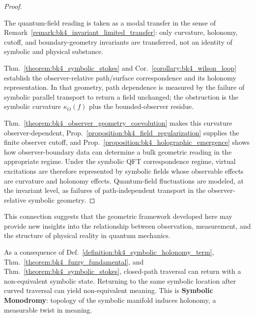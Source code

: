 \begin{proof}
\label{proof:bk4_quantum_geometry}
\leavevmode

\begin{assumption}
The quantum-field reading is taken as a modal transfer in the sense of
Remark~\ref{remark:bk4_invariant_limited_transfer}: only curvature,
holonomy, cutoff, and boundary-geometry invariants are transferred, not an
identity of symbolic and physical substance.
\end{assumption}

Thm.~\ref{theorem:bk4_symbolic_stokes} and
Cor.~\ref{corollary:bk4_wilson_loop} establish the observer-relative
path/surface correspondence and its holonomy representation. In that geometry,
path dependence is measured by the failure of symbolic parallel transport to
return a field unchanged; the obstruction is the symbolic curvature
$\kappa_O(f)$ plus the bounded-observer residue.

Thm.~\ref{theorem:bk4_observer_geometry_coevolution} makes this curvature
observer-dependent, Prop.~\ref{proposition:bk4_field_regularization} supplies
the finite observer cutoff, and Prop.~\ref{proposition:bk4_holographic_emergence}
shows how observer-boundary data can determine a bulk geometric reading in the
appropriate regime. Under the symbolic QFT correspondence regime, virtual
excitations are therefore represented by symbolic fields whose observable
effects are curvature and holonomy effects. Quantum-field fluctuations are
modeled, at the invariant level, as failures of path-independent transport in
the observer-relative symbolic geometry.
\end{proof}

This connection suggests that the geometric framework developed here may provide new insights into the relationship between observation, measurement, and the structure of physical reality in quantum mechanics.

\begin{scholium}
\label{scholium:bk4_symbolic_monodromy}
As a consequence of Def.~\ref{definition:bk4_symbolic_holonomy_term},
Thm.~\ref{theorem:bk4_fuzzy_fundamental}, and
Thm.~\ref{theorem:bk4_symbolic_stokes}, closed-path traversal can return with a
non-equivalent symbolic state.
Returning to the same symbolic location after curved traversal can yield
non-equivalent meaning. This is \textbf{Symbolic Monodromy}: topology of the
symbolic manifold induces holonomy, a measurable twist in meaning.
\end{scholium}

